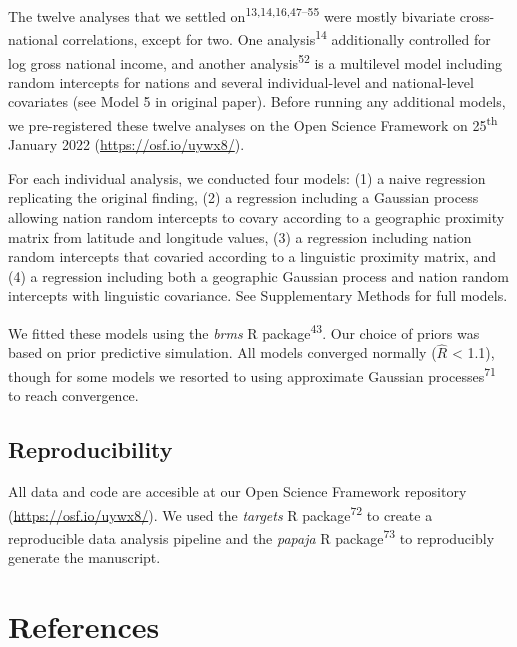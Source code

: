 \documentclass[
  english,
  man,floatsintext]{apa6}
\begin{document}
The twelve analyses that we settled on\textsuperscript{13,14,16,47--55} were mostly bivariate cross-national correlations, except for two. One analysis\textsuperscript{14} additionally controlled for log gross national income, and another analysis\textsuperscript{52} is a multilevel model including random intercepts for nations and several individual-level and national-level covariates (see Model 5 in original paper). Before running any additional models, we pre-registered these twelve analyses on the Open Science Framework on 25\textsuperscript{th} January 2022 (\url{https://osf.io/uywx8/}).

For each individual analysis, we conducted four models: (1) a naive regression replicating the original finding, (2) a regression including a Gaussian process allowing nation random intercepts to covary according to a geographic proximity matrix from latitude and longitude values, (3) a regression including nation random intercepts that covaried according to a linguistic proximity matrix, and (4) a regression including both a geographic Gaussian process and nation random intercepts with linguistic covariance. See Supplementary Methods for full models.

We fitted these models using the \emph{brms} R package\textsuperscript{43}. Our choice of priors was based on prior predictive simulation. All models converged normally (\(\hat{R}\) \textless{} 1.1), though for some models we resorted to using approximate Gaussian processes\textsuperscript{71} to reach convergence.

\hypertarget{reproducibility}{%
\subsection{Reproducibility}\label{reproducibility}}

All data and code are accesible at our Open Science Framework repository (\url{https://osf.io/uywx8/}). We used the \emph{targets} R package\textsuperscript{72} to create a reproducible data analysis pipeline and the \emph{papaja} R package\textsuperscript{73} to reproducibly generate the manuscript.

\newpage

\hypertarget{references}{%
\section{References}\label{references}}

\begingroup
\setlength{\parindent}{-0.5in}
\setlength{\leftskip}{0.5in}
\end{document}
